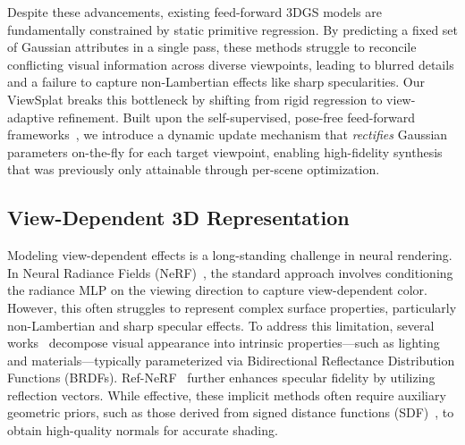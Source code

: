 \documentclass[runningheads]{llncs}
\begin{document}
Despite these advancements, existing feed-forward 3DGS models are fundamentally constrained by static primitive regression. By predicting a fixed set of Gaussian attributes in a single pass, these methods struggle to reconcile conflicting visual information across diverse viewpoints, leading to blurred details and a failure to capture non-Lambertian effects like sharp specularities. Our ViewSplat breaks this bottleneck by shifting from rigid regression to view-adaptive refinement. Built upon the self-supervised, pose-free feed-forward frameworks~\cite{huang2025spfsplat,huang2025spfsplatv2}, we introduce a dynamic update mechanism that \textit{rectifies} Gaussian parameters on-the-fly for each target viewpoint, enabling high-fidelity synthesis that was previously only attainable through per-scene optimization.

\subsection{View-Dependent 3D Representation}
Modeling view-dependent effects is a long-standing challenge in neural rendering. In Neural Radiance Fields (NeRF)~\cite{mildenhall2020nerf}, the standard approach involves conditioning the radiance MLP on the viewing direction to capture view-dependent color. However, this often struggles to represent complex surface properties, particularly non-Lambertian and sharp specular effects. To address this limitation, several works~\cite{boss2021nerd,boss2021neural-pil,srinivasan2021nerv,Zhang2021nerfactor} decompose visual appearance into intrinsic properties---such as lighting and materials---typically parameterized via Bidirectional Reflectance Distribution Functions (BRDFs). Ref-NeRF~\cite{verbin2022ref-nerf} further enhances specular fidelity by utilizing reflection vectors. While effective, these implicit methods often require auxiliary geometric priors, such as those derived from signed distance functions (SDF)~\cite{liu2023nero,liang2023envidr}, to obtain high-quality normals for accurate shading.
\end{document}
